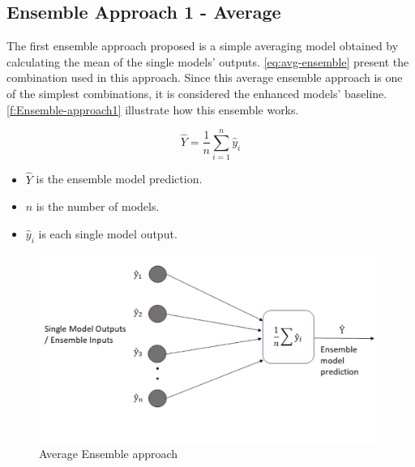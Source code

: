 \subsection{Ensemble Approach 1 - Average}
\label{s:Ensemble-Approach1}
The first ensemble approach proposed is a simple averaging model obtained by calculating the mean of the single models' outputs. \autoref{eq:avg-ensemble} present the combination used in this approach. Since this average ensemble approach is one of the simplest combinations, it is considered the enhanced models' baseline. \autoref{f:Ensemble-approach1} illustrate how this ensemble works.

\begin{equation}\label{eq:avg-ensemble}
    \hat{Y} = \frac{1}{n} \sum_{i=1}^{n}  \hat{y}_i
\end{equation}

\begin{itemize}
    \item \begin{math}\hat{Y}\end{math} is the ensemble model prediction.
    \item \begin{math}n\end{math} is the number of models.
    \item \begin{math}\hat{y}_i\end{math} is each single model output.
\end{itemize}

\begin{figure}[h]
\centering
\includegraphics[width=\linewidth]{figures/Ch4/Ensemble_Approach1.pdf}
\caption{Average Ensemble approach}
\label{f:Ensemble-approach1}
\end{figure}

